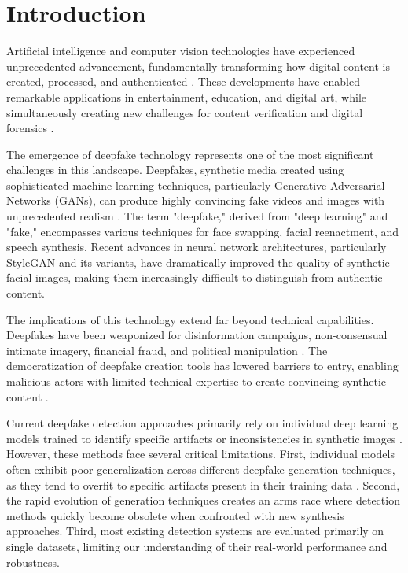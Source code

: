 \documentclass[conference]{IEEEtran}
\begin{document}
\section{Introduction}

Artificial intelligence and computer vision technologies have experienced unprecedented advancement, fundamentally transforming how digital content is created, processed, and authenticated \cite{lecun2015deep}. These developments have enabled remarkable applications in entertainment, education, and digital art, while simultaneously creating new challenges for content verification and digital forensics \cite{verdoliva2020media}.

The emergence of deepfake technology represents one of the most significant challenges in this landscape. Deepfakes, synthetic media created using sophisticated machine learning techniques, particularly Generative Adversarial Networks (GANs), can produce highly convincing fake videos and images with unprecedented realism \cite{goodfellow2014generative}. The term "deepfake," derived from "deep learning" and "fake," encompasses various techniques for face swapping, facial reenactment, and speech synthesis. Recent advances in neural network architectures, particularly StyleGAN \cite{karras2019style} and its variants, have dramatically improved the quality of synthetic facial images, making them increasingly difficult to distinguish from authentic content.

The implications of this technology extend far beyond technical capabilities. Deepfakes have been weaponized for disinformation campaigns, non-consensual intimate imagery, financial fraud, and political manipulation \cite{tolosana2020deepfakes}. The democratization of deepfake creation tools has lowered barriers to entry, enabling malicious actors with limited technical expertise to create convincing synthetic content \cite{rossler2020faceforensics}.

Current deepfake detection approaches primarily rely on individual deep learning models trained to identify specific artifacts or inconsistencies in synthetic images \cite{wang2020cnn}. However, these methods face several critical limitations. First, individual models often exhibit poor generalization across different deepfake generation techniques, as they tend to overfit to specific artifacts present in their training data \cite{dolhansky2020dfdc}. Second, the rapid evolution of generation techniques creates an arms race where detection methods quickly become obsolete when confronted with new synthesis approaches. Third, most existing detection systems are evaluated primarily on single datasets, limiting our understanding of their real-world performance and robustness.
\end{document}
